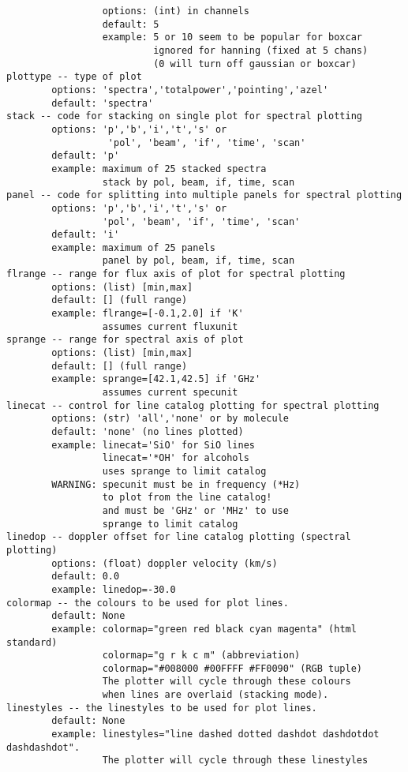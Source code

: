 \begin{verbatim}
                 options: (int) in channels
                 default: 5
                 example: 5 or 10 seem to be popular for boxcar
                          ignored for hanning (fixed at 5 chans)
                          (0 will turn off gaussian or boxcar)
plottype -- type of plot
        options: 'spectra','totalpower','pointing','azel'
        default: 'spectra'
stack -- code for stacking on single plot for spectral plotting
        options: 'p','b','i','t','s' or
                  'pol', 'beam', 'if', 'time', 'scan'
        default: 'p'
        example: maximum of 25 stacked spectra
                 stack by pol, beam, if, time, scan
panel -- code for splitting into multiple panels for spectral plotting
        options: 'p','b','i','t','s' or
                 'pol', 'beam', 'if', 'time', 'scan'
        default: 'i'
        example: maximum of 25 panels
                 panel by pol, beam, if, time, scan
flrange -- range for flux axis of plot for spectral plotting
        options: (list) [min,max]
        default: [] (full range)
        example: flrange=[-0.1,2.0] if 'K'
                 assumes current fluxunit
sprange -- range for spectral axis of plot
        options: (list) [min,max]
        default: [] (full range)
        example: sprange=[42.1,42.5] if 'GHz'
                 assumes current specunit
linecat -- control for line catalog plotting for spectral plotting
        options: (str) 'all','none' or by molecule
        default: 'none' (no lines plotted)
        example: linecat='SiO' for SiO lines
                 linecat='*OH' for alcohols
                 uses sprange to limit catalog
        WARNING: specunit must be in frequency (*Hz)
                 to plot from the line catalog!
                 and must be 'GHz' or 'MHz' to use
                 sprange to limit catalog
linedop -- doppler offset for line catalog plotting (spectral plotting)
        options: (float) doppler velocity (km/s)
        default: 0.0
        example: linedop=-30.0
colormap -- the colours to be used for plot lines.
        default: None
        example: colormap="green red black cyan magenta" (html standard)
                 colormap="g r k c m" (abbreviation)
                 colormap="#008000 #00FFFF #FF0090" (RGB tuple)
                 The plotter will cycle through these colours
                 when lines are overlaid (stacking mode).
linestyles -- the linestyles to be used for plot lines.
        default: None
        example: linestyles="line dashed dotted dashdot dashdotdot dashdashdot".
                 The plotter will cycle through these linestyles

\end{verbatim}
